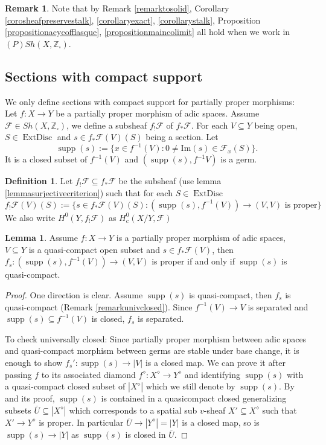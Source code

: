 \documentclass{article}
\theoremstyle{definition}
\newtheorem{definition}[theorem]{Definition}
\newtheorem{lemma}[theorem]{Lemma}
\newtheorem{remark}[theorem]{Remark}
\def\sF{{\mathscr{F}}}
\def\bZ{{\mathbb Z}}
\DeclareMathOperator{\supp}{supp}
\DeclareMathOperator{\ExtDisc}{ExtDisc}
\begin{document}
\begin{remark}
Note that by Remark \ref{remarktosolid}, Corollary \ref{corosheafpreservestalk}, \ref{corollaryexact}, \ref{corollarystalk}, Proposition \ref{propositionacycofflasque}, \ref{propositionmaincolimit} all hold when we work in $\mathit{(P)Sh}(X,\bZ_\square)$.
\end{remark}



\subsection{Sections with compact support}

We only define sections with compact support for partially proper morphisms: Let $f:X\to Y$ be a partially proper morphism of adic spaces.  Assume $\sF\in \mathit{Sh}(X,\bZ_\square)$, we define a subsheaf $f_!\sF$ of $f_*\sF$. For each $V\subseteq Y$ being open, $S\in \ExtDisc$ and $s\in f_*\sF(V)(S)$ being a section. Let
$$\supp(s):=\{x\in f^{-1}(V): 0\neq \mathrm{Im}(s)\in \sF_x(S)\}.$$
It is a closed subset of $f^{-1}(V)$ and $(\supp(s),f^{-1}V)$ is a germ.

\begin{definition}
	Let $f_!\sF\subseteq f_*\sF$ be the subsheaf (use lemma \ref{lemmasurjectivecriterion}) such that for each $S\in \ExtDisc$ 
	$$f_!\sF(V)(S):=\{s\in f_*\sF(V)(S): (\supp(s),f^{-1}(V))\to (V,V) \text{ is proper}\}  $$
	We also write $H^0(Y,f_!\sF)$ as $H^0_c(X/Y,\sF)$
\end{definition}

\begin{lemma}\label{partialsection}
	Assume $f:X\to Y$ is a partially proper morphism of adic spaces, $V\subseteq Y$ is a quasi-compact open subset and $s\in f_*\sF(V)$, then $f_s:(\supp(s),f^{-1}(V))\to (V,V)$ is proper if and only if $\supp(s)$ is quasi-compact. 
\end{lemma}

\begin{proof}
	One direction is clear. Assume $\supp(s)$ is quasi-compact, then $f_s$ is quasi-compact (Remark \ref{remarkunivclosed}). Since $f^{-1}(V)\to V$ is separated and $\supp(s)\subseteq f^{-1}(V)$ is closed, $f_s$ is separated. 
	
	To check universally closed: Since partially proper morphism between adic spaces and quasi-compact morphism between germs are stable under base change, it is enough to show $f_s':\supp(s)\to |V|$ is a closed map. We can prove it after passing $f$ to its associated diamond $f^\diamond:X^\diamond\to Y^\diamond$ and identifying $\supp(s)$ with a quasi-compact closed subset of $|X^\diamond|$ which we still denote by $\supp(s)$. By \cite[Proposition 18.10]{scholze2022etale} and its proof, $\supp(s)$ is contained in a quasicompact closed generalizing subsets $\overline{U}\subseteq |X^\diamond|$ which corresponds to a spatial sub $v$-sheaf $X'\subseteq X^\diamond$ such that $X'\to Y^\diamond$ is proper. In particular $\overline{U}\to |Y^\diamond|=|Y|$ is a closed map, so is $\supp(s)\to |Y|$ as $\supp(s)$ is closed in $\overline{U}$.
	\end{proof}
	
\end{document}
